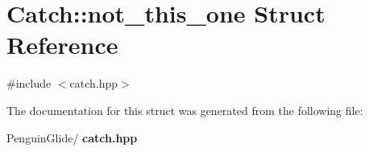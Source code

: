 \section{Catch\+::not\+\_\+this\+\_\+one Struct Reference}
\label{struct_catch_1_1not__this__one}


{\ttfamily \#include $<$catch.\+hpp$>$}



The documentation for this struct was generated from the following file\+:\begin{DoxyCompactItemize}
\item 
Penguin\+Glide/\textbf{ catch.\+hpp}\end{DoxyCompactItemize}
